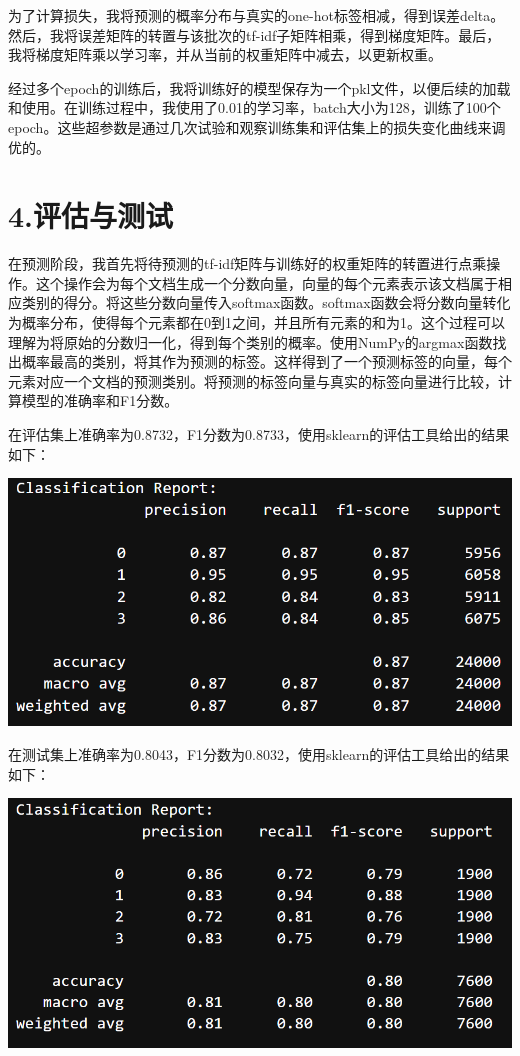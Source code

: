\documentclass[12pt,letterpaper]{article}
\begin{document}
为了计算损失，我将预测的概率分布与真实的one-hot标签相减，得到误差delta。然后，我将误差矩阵的转置与该批次的tf-idf子矩阵相乘，得到梯度矩阵。最后，我将梯度矩阵乘以学习率，并从当前的权重矩阵中减去，以更新权重。

经过多个epoch的训练后，我将训练好的模型保存为一个pkl文件，以便后续的加载和使用。在训练过程中，我使用了0.01的学习率，batch大小为128，训练了100个epoch。这些超参数是通过几次试验和观察训练集和评估集上的损失变化曲线来调优的。

\section*{4.评估与测试}
在预测阶段，我首先将待预测的tf-idf矩阵与训练好的权重矩阵的转置进行点乘操作。这个操作会为每个文档生成一个分数向量，向量的每个元素表示该文档属于相应类别的得分。将这些分数向量传入softmax函数。softmax函数会将分数向量转化为概率分布，使得每个元素都在0到1之间，并且所有元素的和为1。这个过程可以理解为将原始的分数归一化，得到每个类别的概率。使用NumPy的argmax函数找出概率最高的类别，将其作为预测的标签。这样得到了一个预测标签的向量，每个元素对应一个文档的预测类别。将预测的标签向量与真实的标签向量进行比较，计算模型的准确率和F1分数。

在评估集上准确率为0.8732，F1分数为0.8733，使用sklearn的评估工具给出的结果如下：

\includegraphics[scale=0.8]{1.png}

在测试集上准确率为0.8043，F1分数为0.8032，使用sklearn的评估工具给出的结果如下：

\includegraphics[scale=0.8]{2.png}
\end{document}
